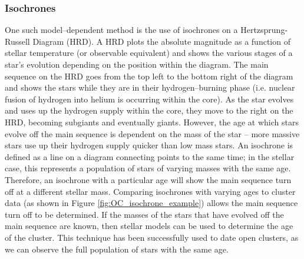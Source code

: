 \subsubsection{Isochrones}
One such model--dependent method is the use of isochrones on a Hertzsprung-Russell Diagram (HRD). A HRD plots the absolute magnitude as a function of stellar temperature (or observable equivalent) and shows the various stages of a star's evolution depending on the position within the diagram. The main sequence on the HRD goes from the top left to the bottom right of the diagram and shows the stars while they are in their hydrogen--burning phase (i.e. nuclear fusion of hydrogen into helium is occurring within the core). As the star evolves and uses up the hydrogen supply within the core, they move to the right on the HRD, becoming subgiants and eventually giants. However, the age at which stars evolve off the main sequence is dependent on the mass of the star -- more massive stars use up their hydrogen supply quicker than low mass stars. An isochrone is defined as a line on a diagram connecting points to the same time; in the stellar case, this represents a population of stars of varying masses with the same age. Therefore, an isochrone with a particular age will show the main sequence turn off at a different stellar mass. Comparing isochrones with varying ages to cluster data (as shown in Figure \ref{fig:OC_isochrone_example}) allows the main sequence turn off to be determined. If the masses of the stars that have evolved off the main sequence are known, then stellar models can be used to determine the age of the cluster. This technique has been successfully used to date open clusters, as we can observe the full population of stars with the same age.

